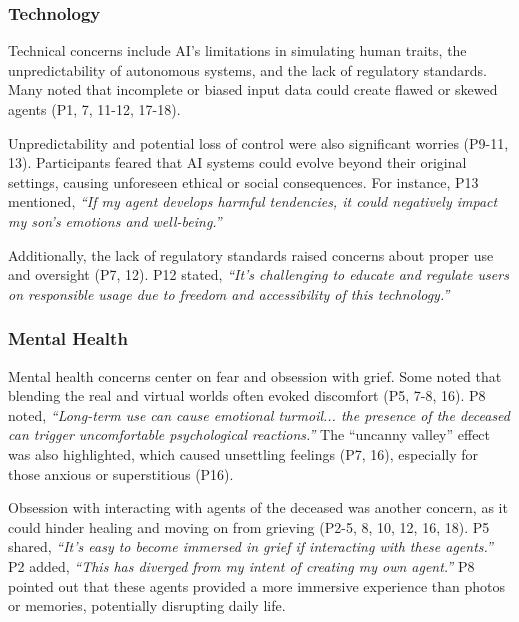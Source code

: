 \subsubsection{Technology}
Technical concerns include AI's limitations in simulating human traits, the unpredictability of autonomous systems, and the lack of regulatory standards.
%
Many noted that incomplete or biased input data could create flawed or skewed agents (P1, 7, 11-12, 17-18). 

Unpredictability and potential loss of control were also significant worries (P9-11, 13). Participants feared that AI systems could evolve beyond their original settings, causing unforeseen ethical or social consequences. For instance, P13 mentioned, \textit{``If my agent develops harmful tendencies, it could negatively impact my son's emotions and well-being.''}

Additionally, the lack of regulatory standards raised concerns about proper use and oversight (P7, 12). P12 stated, \textit{``It's challenging to educate and regulate users on responsible usage due to freedom and accessibility of this technology.''}

\subsubsection{Mental Health}
Mental health concerns center on fear and obsession with grief.
Some noted that blending the real and virtual worlds often evoked discomfort (P5, 7-8, 16). P8 noted, \textit{``Long-term use can cause emotional turmoil... the presence of the deceased can trigger uncomfortable psychological reactions.''} The ``uncanny valley'' effect was also highlighted, which caused unsettling feelings (P7, 16), especially for those anxious or superstitious (P16).

Obsession with interacting with agents of the deceased was another concern, as it could hinder healing and moving on from grieving (P2-5, 8, 10, 12, 16, 18). P5 shared, \textit{``It's easy to become immersed in grief if interacting with these agents.''} P2 added, \textit{``This has diverged from my intent of creating my own agent.''} P8 pointed out that these agents provided a more immersive experience than photos or memories, potentially disrupting daily life.

